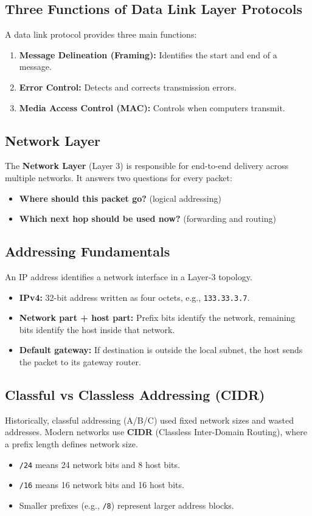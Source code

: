\documentclass[12pt,a4paper]{article}
\begin{document}
\subsection*{Three Functions of Data Link Layer Protocols}
A data link protocol provides three main functions:

\begin{enumerate}
    \item \textbf{Message Delineation (Framing):} Identifies the start and end of a message.
    \item \textbf{Error Control:} Detects and corrects transmission errors.
    \item \textbf{Media Access Control (MAC):} Controls when computers transmit.
\end{enumerate}


\subsection{Network Layer}
The \textbf{Network Layer} (Layer 3) is responsible for end-to-end delivery across multiple networks. It answers two questions for every packet:
\begin{itemize}
    \item \textbf{Where should this packet go?} (logical addressing)
    \item \textbf{Which next hop should be used now?} (forwarding and routing)
\end{itemize}

\subsection*{Addressing Fundamentals}
An IP address identifies a network interface in a Layer-3 topology.
\begin{itemize}
    \item \textbf{IPv4:} 32-bit address written as four octets, e.g., \texttt{133.33.3.7}.
    \item \textbf{Network part + host part:} Prefix bits identify the network, remaining bits identify the host inside that network.
    \item \textbf{Default gateway:} If destination is outside the local subnet, the host sends the packet to its gateway router.
\end{itemize}

\subsection*{Classful vs Classless Addressing (CIDR)}
Historically, classful addressing (A/B/C) used fixed network sizes and wasted addresses. Modern networks use \textbf{CIDR} (Classless Inter-Domain Routing), where a prefix length defines network size.
\begin{itemize}
    \item \texttt{/24} means 24 network bits and 8 host bits.
    \item \texttt{/16} means 16 network bits and 16 host bits.
    \item Smaller prefixes (e.g., \texttt{/8}) represent larger address blocks.
\end{itemize}
\end{document}
